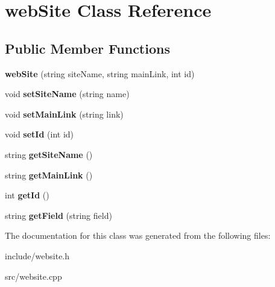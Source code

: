 \hypertarget{classwebSite}{}\section{web\+Site Class Reference}
\label{classwebSite}
\subsection*{Public Member Functions}
\begin{DoxyCompactItemize}
\item 
\mbox{\label{classwebSite_a8c9a9a0b8a5b24d1dd443924a92454a2}} 
{\bfseries web\+Site} (string site\+Name, string main\+Link, int id)
\item 
\mbox{\label{classwebSite_aca75cc0b212650bd873fd2e7db1a2e2c}} 
void {\bfseries set\+Site\+Name} (string name)
\item 
\mbox{\label{classwebSite_a3ad361449285b0274d109c6e59e5aa74}} 
void {\bfseries set\+Main\+Link} (string link)
\item 
\mbox{\label{classwebSite_a751ffb27dc24de4bd8656c3e8e949fa7}} 
void {\bfseries set\+Id} (int id)
\item 
\mbox{\label{classwebSite_ad74bed1a5bf504c6fc49ac4f6489f677}} 
string {\bfseries get\+Site\+Name} ()
\item 
\mbox{\label{classwebSite_a631d0e50f03ae59258a55cf3056f00c8}} 
string {\bfseries get\+Main\+Link} ()
\item 
\mbox{\label{classwebSite_a7ce06b3c0b9bf7a86e2d4cb76be09e8f}} 
int {\bfseries get\+Id} ()
\item 
\mbox{\label{classwebSite_a3d906dbf276d3fd3b6a6012e9ae9e92c}} 
string {\bfseries get\+Field} (string field)
\end{DoxyCompactItemize}


The documentation for this class was generated from the following files\+:\begin{DoxyCompactItemize}
\item 
include/website.\+h\item 
src/website.\+cpp\end{DoxyCompactItemize}
